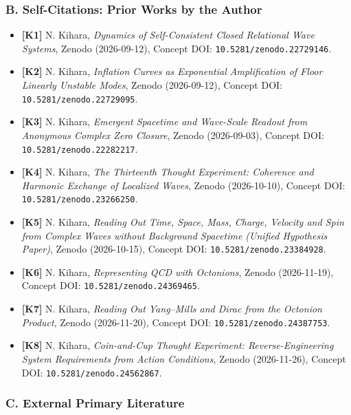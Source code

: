 \documentclass[
  a4paper,
]{article}
\providecommand{\tightlist}{%
  \setlength{\itemsep}{0pt}\setlength{\parskip}{0pt}}
\begin{document}
\subsubsection{B. Self-Citations: Prior Works by the
Author}\label{b.-self-citations-prior-works-by-the-author}

\begin{itemize}
\tightlist
\item
  \textbf{{[}K1{]}} N. Kihara, \emph{Dynamics of Self-Consistent Closed
  Relational Wave Systems}, Zenodo (2026-09-12), Concept DOI:
  \texttt{10.5281/zenodo.22729146}.
\item
  \textbf{{[}K2{]}} N. Kihara, \emph{Inflation Curves as Exponential
  Amplification of Floor Linearly Unstable Modes}, Zenodo (2026-09-12),
  Concept DOI: \texttt{10.5281/zenodo.22729095}.
\item
  \textbf{{[}K3{]}} N. Kihara, \emph{Emergent Spacetime and Wave-Scale
  Readout from Anonymous Complex Zero Closure}, Zenodo (2026-09-03),
  Concept DOI: \texttt{10.5281/zenodo.22282217}.
\item
  \textbf{{[}K4{]}} N. Kihara, \emph{The Thirteenth Thought Experiment:
  Coherence and Harmonic Exchange of Localized Waves}, Zenodo
  (2026-10-10), Concept DOI: \texttt{10.5281/zenodo.23266250}.
\item
  \textbf{{[}K5{]}} N. Kihara, \emph{Reading Out Time, Space, Mass,
  Charge, Velocity and Spin from Complex Waves without Background
  Spacetime (Unified Hypothesis Paper)}, Zenodo (2026-10-15), Concept
  DOI: \texttt{10.5281/zenodo.23384928}.
\item
  \textbf{{[}K6{]}} N. Kihara, \emph{Representing QCD with Octonions},
  Zenodo (2026-11-19), Concept DOI: \texttt{10.5281/zenodo.24369465}.
\item
  \textbf{{[}K7{]}} N. Kihara, \emph{Reading Out Yang--Mills and Dirac
  from the Octonion Product}, Zenodo (2026-11-20), Concept DOI:
  \texttt{10.5281/zenodo.24387753}.
\item
  \textbf{{[}K8{]}} N. Kihara, \emph{Coin-and-Cup Thought Experiment:
  Reverse-Engineering System Requirements from Action Conditions},
  Zenodo (2026-11-26), Concept DOI: \texttt{10.5281/zenodo.24562867}.
\end{itemize}

\subsubsection{C. External Primary
Literature}\label{c.-external-primary-literature}
\end{document}
